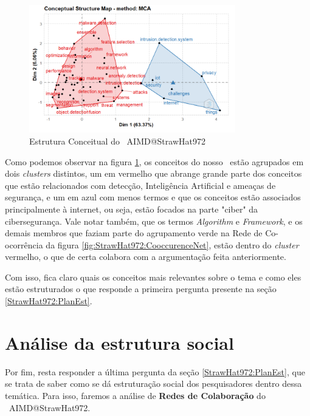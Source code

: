\begin{figure}[H]
    \centering
    \includegraphics[width=0.8\textwidth]{experiments/StrawHat972/PesqBibliogr/IA-DeteccaoMalware/WoS-20220209/Imagens/AIMDFactorialAnalysis.png}
    \caption{Estrutura Conceitual do \dataset\ AIMD@StrawHat972}
    \label{fig:StrawHat972:FactorialAnalysis}
\end{figure}

Como podemos observar na figura \ref{fig:StrawHat972:FactorialAnalysis}, os conceitos do nosso \dataset\ estão agrupados em dois \textit{clusters} distintos, um em vermelho que abrange grande parte dos conceitos que estão relacionados com detecção, Inteligência Artificial e ameaças de segurança, e um em azul com menos termos e que os conceitos estão associados principalmente à internet, ou seja, estão focados na parte "ciber" da cibersegurança. Vale notar também, que os termos \textit{Algorithm} e \textit{Framework}, e os demais membros que faziam parte do agrupamento verde na Rede de Co-ocorrência da figura \ref{fig:StrawHat972:CooccurenceNet}, estão dentro do \textit{cluster} vermelho, o que de certa colabora com a argumentação feita anteriormente.

Com isso, fica claro quais os conceitos mais relevantes sobre o tema e como eles estão estruturados o que responde a primeira pergunta presente na seção \ref{StrawHat972:PlanEst}.

\section{Análise da estrutura social}

Por fim, resta responder a última pergunta da seção \ref{StrawHat972:PlanEst}, que se trata de saber como se dá estruturação social dos pesquisadores dentro dessa temática. Para isso, faremos a análise de \textbf{Redes de Colaboração} do \dataset\ AIMD@StrawHat972.


